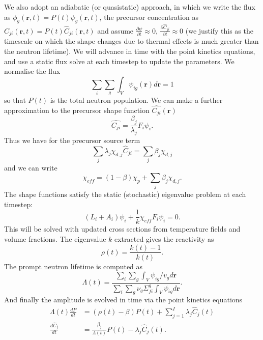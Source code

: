 \documentclass[12pt]{article}
\begin{document}
We also adopt an adiabatic (or quasistatic) approach, in which we write the flux as $\phi_g(\mathbf{r},t)=P(t)\psi_g(\mathbf{r},t)$, the precursor concentration as $C_{ji}(\mathbf{r},t)=P(t)\hat{C}_{ji}(\mathbf{r},t) $ and assume $\frac{\partial \psi}{\partial t}\approx 0$, $\frac{\partial \hat{C}_{ji}}{\partial t}\approx 0$ (we justify this as the timescale on which the shape changes due to thermal effects is much greater than the neutron lifetime). We will advance in time with the point kinetics equations, and use a static flux solve at each timestep to update the parameters. We normalise the flux 
\begin{equation}
    \sum_i \sum_g \int _V \psi_{ig}(\mathbf{r})d\mathbf{r}=1
\end{equation}
so that $P(t)$ is the total neutron population. We can make a further approximation to the precursor shape function $\hat{C_{ji}}(\mathbf{r})$
\begin{equation}
    \hat{C_{ji}}=\frac{\beta_j}{\lambda_j}F_i \psi_i.
\end{equation}
Thus we have for the precursor source term
\begin{equation}
    \sum_j \lambda_j \chi_{d,j} \hat{C}_{ji}=\sum_j \beta_j \chi_{d,j}
\end{equation}
and we can write 
\begin{equation}
    \chi_{eff}=(1-\beta)\chi_p +\sum_j \beta_j \chi_{d,j}.
\end{equation}
The shape functions satisfy the static (stochastic) eigenvalue problem at each timestep: 
\begin{equation}
    (L_i +A_i) \psi_i +\frac{1}{k} \chi_{eff} F_i \psi_i=0.
\end{equation}
This will be solved with updated cross sections from temperature fields and volume fractions. The eigenvalue $k$ extracted gives the reactivity as 
\begin{equation}
    \rho(t)= \frac{k(t)-1}{k(t)}.
\end{equation}
The prompt neutron lifetime is computed as 
\begin{equation}
    \Lambda (t)=\frac{\sum_i \sum_g \int_V \psi_{ig}/v_g d\mathbf{r}}{\sum_i \sum_g \nu_g \Sigma_{fi}^g\int_V \psi_{ig} d\mathbf{r}}.
\end{equation}
And finally the amplitude is evolved in time via the point kinetics equations 
\begin{align}
    \Lambda (t)\frac{dP}{dt}&=(\rho(t)-\beta)P(t)+\sum_{j=1}^I\lambda_j \hat{C}_j (t) \\ 
    \frac{d\hat{C}_j }{dt}&=\frac{\beta_j}{\Lambda (t)} P(t) -\lambda_j \hat{C}_j(t).
\end{align}
\end{document}
